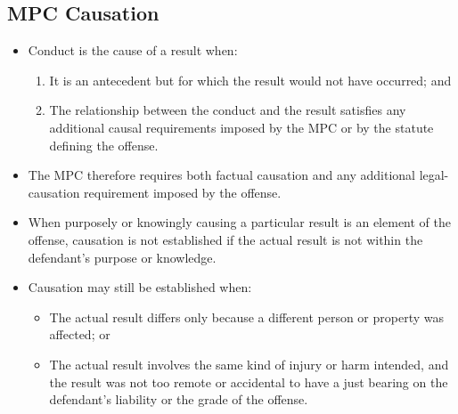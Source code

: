 \documentclass[11pt]{tex/lawoutline}
\begin{document}
\subsection{MPC Causation}

{
\begin{itemize}
    \item Conduct is the cause of a result when:
    \begin{enumerate}
        \item It is an antecedent but for which the result would not have occurred; and
        \item The relationship between the conduct and the result satisfies any additional causal requirements imposed by the MPC or by the statute defining the offense.
    \end{enumerate}
    \item The MPC therefore requires both factual causation and any additional legal-causation requirement imposed by the offense.
\end{itemize}
}

{
\begin{itemize}
    \item When purposely or knowingly causing a particular result is an element of the offense, causation is not established if the actual result is not within the defendant's purpose or knowledge.
    \item Causation may still be established when:
    \begin{itemize}
        \item The actual result differs only because a different person or property was affected; or
        \item The actual result involves the same kind of injury or harm intended, and the result was not too remote or accidental to have a just bearing on the defendant's liability or the grade of the offense.
    \end{itemize}
\end{itemize}
}
\end{document}

